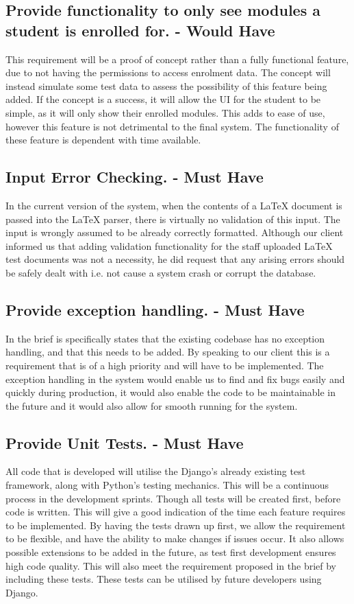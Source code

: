 \documentclass[12pt]{article}
\begin{document}
	\subsection{Provide functionality to only see modules a student is enrolled for. - Would Have}
	This requirement will be a proof of concept rather than a fully functional feature, due to not having the permissions to access enrolment data. The concept will instead simulate some test data to assess the possibility of this feature being added. If the concept is a success, it will allow the UI for the student to be simple, as it will only show their enrolled modules. This adds to ease of use, however this feature is not detrimental to the final system. The functionality of these feature is dependent with time available.
	\subsection{Input Error Checking. - Must Have}
	In the current version of the system, when the contents of a LaTeX document is passed into the LaTeX parser, there is virtually no validation of this input. The input is wrongly assumed to be already correctly formatted. Although our client informed us that adding validation functionality for the staff uploaded LaTeX test documents was not a necessity, he did request that any arising errors should be safely dealt with i.e. not cause a system crash or corrupt the database.
	\subsection{Provide exception handling. - Must Have}
	In the brief is specifically states that the existing codebase has no exception handling, and that this needs to be added. By speaking to our client this is a requirement that is of a high priority and will have to be implemented.
The exception handling in the system would enable us to find and fix bugs easily and quickly during production, it would also enable the code to be maintainable in the future and it would also allow for smooth running for the system.

	\subsection{Provide Unit Tests. - Must Have}
	All code that is developed will utilise the Django’s already existing test framework, along with Python’s testing mechanics. This will be a continuous process in the development sprints. Though all tests will be created first, before code is written. This will give a good indication of the time each feature requires to be implemented. By having the tests drawn up first, we allow the requirement to be flexible, and have the ability to make changes if issues occur. It also allows possible extensions to be added in the future, as test first development ensures high code quality. This will also meet the requirement proposed in the brief by including these tests. These tests can be utilised by future developers using Django.
\end{document}
